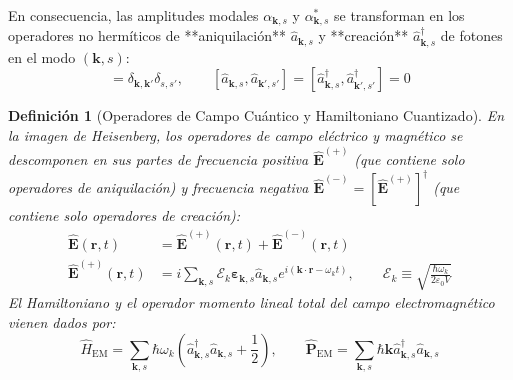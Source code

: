 \documentclass[11pt,a4paper]{book}
\newtheorem{definicion}{Definición}[chapter]
\begin{document}
En consecuencia, las amplitudes modales $\alpha_{\mathbf{k},s}$ y $\alpha_{\mathbf{k},s}^*$ se transforman en los operadores no hermíticos de **aniquilación** $\hat{a}_{\mathbf{k},s}$ y **creación** $\hat{a}_{\mathbf{k},s}^\dagger$ de fotones en el modo $(\mathbf{k}, s)$:
\begin{equation}
[\hat{a}_{\mathbf{k},s}, \hat{a}_{\mathbf{k}',s'}^\dagger] = \delta_{\mathbf{k},\mathbf{k}'} \delta_{s,s'}, \qquad [\hat{a}_{\mathbf{k},s}, \hat{a}_{\mathbf{k}',s'}] = [\hat{a}_{\mathbf{k},s}^\dagger, \hat{a}_{\mathbf{k}',s'}^\dagger] = 0
\end{equation}

\begin{definicion}[Operadores de Campo Cuántico y Hamiltoniano Cuantizado]
En la imagen de Heisenberg, los operadores de campo eléctrico y magnético se descomponen en sus partes de frecuencia positiva $\hat{\mathbf{E}}^{(+)}$ (que contiene solo operadores de aniquilación) y frecuencia negativa $\hat{\mathbf{E}}^{(-)} = [\hat{\mathbf{E}}^{(+)}]^\dagger$ (que contiene solo operadores de creación):
\begin{align}
\hat{\mathbf{E}}(\mathbf{r}, t) &= \hat{\mathbf{E}}^{(+)}(\mathbf{r}, t) + \hat{\mathbf{E}}^{(-)}(\mathbf{r}, t) \\
\hat{\mathbf{E}}^{(+)}(\mathbf{r}, t) &= i \sum_{\mathbf{k}, s} \mathcal{E}_k \bm{\varepsilon}_{\mathbf{k},s} \hat{a}_{\mathbf{k},s} e^{i(\mathbf{k}\cdot\mathbf{r} - \omega_k t)}, \qquad \mathcal{E}_k \equiv \sqrt{\frac{\hbar \omega_k}{2\varepsilon_0 V}}
\end{align}
El Hamiltoniano y el operador momento lineal total del campo electromagnético vienen dados por:
\begin{equation}
\hat{H}_{\text{EM}} = \sum_{\mathbf{k}, s} \hbar \omega_k \left( \hat{a}_{\mathbf{k},s}^\dagger \hat{a}_{\mathbf{k},s} + \frac{1}{2} \right), \qquad \hat{\mathbf{P}}_{\text{EM}} = \sum_{\mathbf{k}, s} \hbar \mathbf{k} \hat{a}_{\mathbf{k},s}^\dagger \hat{a}_{\mathbf{k},s}
\end{equation}
\end{definicion}
\end{document}
